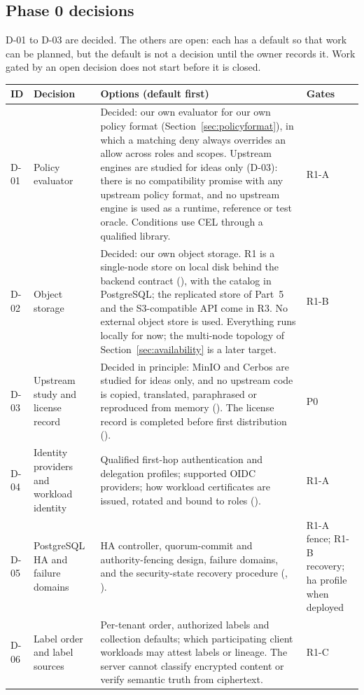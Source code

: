 \subsection{Phase 0 decisions}\label{sec:decisions}
D-01 to D-03 are decided. The others are open: each has a default so that work can be planned, but the default is not a decision until the owner records it. Work gated by an open decision does not start before it is closed.
\begin{longtable}{@{}P{0.06\textwidth}P{0.22\textwidth}P{0.46\textwidth}P{0.12\textwidth}@{}}
\toprule ID & Decision & Options (default first) & Gates\\\midrule\endhead
D-01 & Policy evaluator & Decided: our own evaluator for our own policy format  (Section~\ref{sec:policyformat}), in which a matching deny always overrides an allow across roles and scopes. Upstream engines are studied for ideas only (D-03): there is no compatibility promise with any upstream policy format, and no upstream engine is used as a runtime, reference or test oracle. Conditions use CEL through a qualified library. & R1-A\\
D-02 & Object storage & Decided: our own object storage. R1 is a single-node store on local disk behind the backend contract (), with the catalog in PostgreSQL; the replicated store of Part~5 and the S3-compatible API come in R3. No external object store is used. Everything runs locally for now; the multi-node topology of Section~\ref{sec:availability} is a later target. & R1-B\\
D-03 & Upstream study and license record & Decided in principle: MinIO and Cerbos are studied for ideas only, and no upstream code is copied, translated, paraphrased or reproduced from memory (). The license record is completed before first distribution (). & P0\\
D-04 & Identity providers and workload identity & Qualified first-hop authentication and delegation profiles; supported OIDC providers; how workload certificates are issued, rotated and bound to roles (). & R1-A\\
D-05 & PostgreSQL HA and failure domains & HA controller, quorum-commit and authority-fencing design, failure domains, and the security-state recovery procedure (, ). & R1-A fence; R1-B recovery; ha profile when deployed\\
D-06 & Label order and label sources & Per-tenant order, authorized labels and collection defaults; which participating client workloads may attest labels or lineage. The server cannot classify encrypted content or verify semantic truth from ciphertext. & R1-C\\

\end{longtable}
